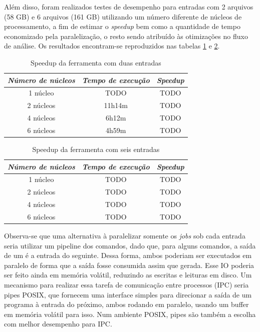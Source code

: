 \documentclass[cic,tc]{iiufrgs}
\begin{document}
Além disso, foram realizados testes de desempenho para entradas com 2 arquivos
(58 GB) e 6 arquivos (161 GB) utilizando um número diferente de núcleos de
processamento, a fim de estimar o \textit{speedup} bem como a quantidade de
tempo economizado pela paralelização, o resto sendo atribuído às otimizações no
fluxo de análise. Os resultados encontram-se reproduzidos nas tabelas
\ref{tbl:speedup2} e \ref{tbl:speedup6}.

\begin{table}[h]
    \caption{Speedup da ferramenta com duas entradas}
    \centering
        \begin{tabular}{c|c|c}
          \hline
          \textit{Número de núcleos}  &   \textit{Tempo de execução}  & \textit{Speedup} \\
          \hline
          \hline
          1 núcleo & TODO & TODO \\
          2 núcleos & 11h14m & TODO \\
          4 núcleos & 6h12m & TODO \\
          6 núcleos & 4h59m & TODO \\
          \hline
        \end{tabular}
    \label{tbl:speedup2}
\end{table}

\begin{table}[h]
    \caption{Speedup da ferramenta com seis entradas}
    \centering
        \begin{tabular}{c|c|c}
          \hline
          \textit{Número de núcleos}  &   \textit{Tempo de execução}  & \textit{Speedup} \\
          \hline
          \hline
          1 núcleo & TODO & TODO \\
          2 núcleos & TODO & TODO \\
          4 núcleos & TODO & TODO \\
          6 núcleos & TODO & TODO \\
          \hline
        \end{tabular}
    \label{tbl:speedup6}
\end{table}

Observa-se que uma alternativa à paralelizar somente os \textit{jobs} sob cada
entrada seria utilizar um pipeline dos comandos, dado que, para alguns
comandos, a saída de um é a entrada do seguinte. Dessa forma, ambos poderiam
ser executados em paralelo de forma que a saída fosse consumida assim que
gerada. Esse IO poderia ser feito ainda em memória volátil, reduzindo as
escritas e leituras em disco. Um mecanismo para realizar essa tarefa de
comunicação entre processos (IPC) seria pipes POSIX, que fornecem uma interface
simples para direcionar a saída de um programa à entrada do próximo, ambos
rodando em paralelo, usando um buffer em memória volátil para
isso.\cite{immich2003performance} Num ambiente POSIX, pipes são também a
escolha com melhor desempenho para IPC.\cite{immich2003performance}
\end{document}

